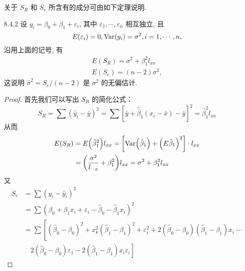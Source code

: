 关于 $S_R$ 和 $S_e$ 所含有的成分可由如下定理说明.
\begin{theorem}{}{8.4.2}
    设  $y_i = \beta_0 + \beta_1 + \varepsilon_i$, 其中  $\varepsilon_1, \cdots, \varepsilon_n$ 相互独立, 且
    \begin{equation*}
    E(\varepsilon_i) = 0, \operatorname{Var}(y_i) = \sigma^2, i = 1, \cdots, n,
    \end{equation*}
    沿用上面的记号, 有
    \begin{align}
    E(S_R) =\sigma^2 + \beta_{1}^{2} l_{xx}\\
    E(S_e) = (n-2)\sigma^2,
    \end{align}
    这说明 $\hat{\sigma}^2 = S_{e}/(n-2)$ 是 $\sigma^2$ 的无偏估计.
\end{theorem}
\begin{proof}
    首先我们可以写出 $S_R$ 的简化公式：
    \begin{equation}
    S_{R}=\sum\left(\hat{y}_{i}-\bar{y}\right)^{2}=\sum\left[\bar{y}+\hat{\bar{\beta}}_{1}\left(x_{i}-\bar{x}\right)-\bar{y}\right]^{2}=\hat{\beta}_{1}^{2} l_{x x}
    \end{equation}\label{eq:8.4.16}
    从而
    \begin{equation*}
    \begin{aligned}
    E\left(S_{R}\right) &=E\left(\hat{\beta}_{1}^{2}\right) l_{x x}=\left[\Var\left(\hat{\beta}_{1}\right)+\left(E \hat{\beta}_{1}\right)^{2}\right] \cdot l_{x x} \\
    &=\left(\frac{\sigma^{2}}{l_{-x}}+\beta_{1}^{2}\right) l_{x x}=\sigma^{2}+\beta_{1}^{2} l_{x x}
    \end{aligned}
    \end{equation*}
    又
    \begin{equation*}
    \begin{aligned}
    S_{e}
    & =\sum\left(y_{i}-\hat{y}_{i}\right)^{2} \\
    & =\sum\left(\beta_{0}+\beta_{1} x_{i}+\varepsilon_{i}-\hat{\beta}_{0}-\hat{\beta}_{1} x_{i}\right)^{2}\\
    & =\sum\left[\left(\hat{\beta}_{0}-\beta_{0}\right)^{2}+x_{k}^{2}\left(\hat{\beta}_{1}-\beta_{1}\right)^{2}+\varepsilon_{i}^{2}+  2(\hat{\beta}_{0}-\beta_{0})\left(\hat{\beta}_{1}-\beta_{1}\right) x_{i}-\right.\\
    & \quad \left.2\left(\hat{\beta}_{0}-\beta_{0}\right) \varepsilon_{1}-2\left(\hat{\beta}_{1}-\beta_{1}\right) x_{i} \varepsilon_{i}\right]
    \end{aligned}
    \end{equation*}

\end{proof}
